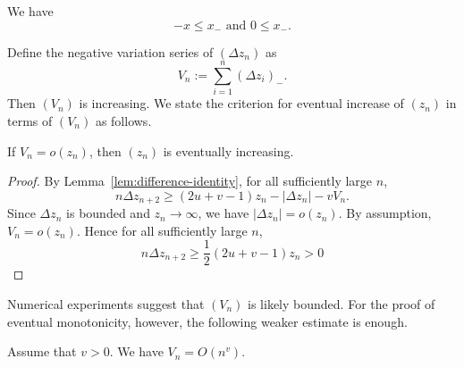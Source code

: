 We have
\begin{equation}
  \label{ineq:negative-variation}
  -x \le x_{-} \text{ and } 0 \le x_{-}.
\end{equation}

Define the negative variation series of $(\Delta z_n)$ as
\begin{equation}
  \label{eq:negative-variation}
  V_n := \sum_{i=1}^{n} (\Delta z_i)_{-}.
\end{equation}
Then $(V_n)$ is increasing. We state the criterion for eventual increase of $(z_n)$ in terms of $(V_n)$ as follows.

\begin{lemma}
  If $V_n = o(z_n)$, then $(z_n)$ is eventually increasing.
\end{lemma}

\begin{proof}
  By Lemma~\ref{lem:difference-identity}, for all sufficiently large $n$,
  $$n\Delta z_{n+2} \ge (2u+v-1)z_n-|\Delta z_n|-vV_n.$$
  Since $\Delta z_n$ is bounded and $z_n\to\infty$, we have $|\Delta z_n|=o(z_n)$. By assumption, $V_n = o(z_n)$. Hence for all sufficiently large $n$,
  $$n\Delta z_{n+2} \ge \dfrac{1}{2}(2u+v-1)z_n > 0$$
\end{proof}



Numerical experiments suggest that $(V_n)$ is likely bounded. For the proof of eventual monotonicity, however, the following weaker estimate is enough.

\begin{lemma}
  Assume that $v>0$.
  We have $V_n = O(n^v)$.
\end{lemma}

